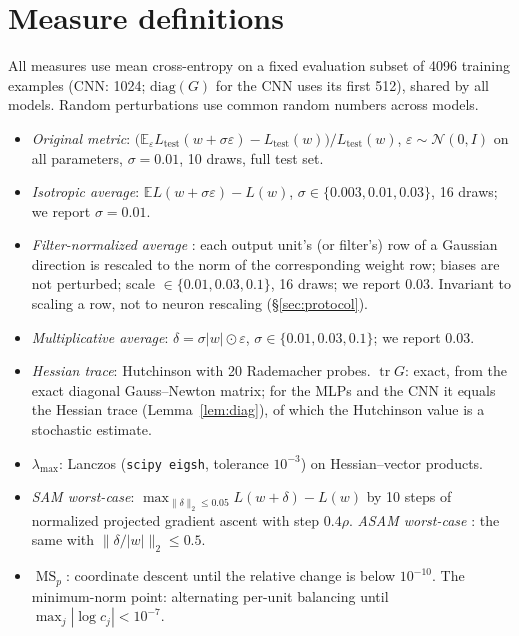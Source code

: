 \documentclass[10pt]{article}
\theoremstyle{remark}
\newcommand{\tr}{\operatorname{tr}}
\newcommand{\MS}{\operatorname{MS}}
\begin{document}



\appendix
\section{Measure definitions}\label{app:measures}
All measures use mean cross-entropy on a fixed evaluation subset of 4096 training examples (CNN: 1024; $\mathrm{diag}(G)$ for the CNN uses its first 512), shared by all models. Random perturbations use common random numbers across models.
\begin{itemize}[leftmargin=1.2em,itemsep=1pt]
\item \emph{Original metric}: $\big(\mathbb{E}_\varepsilon L_{\mathrm{test}}(w+\sigma\varepsilon)-L_{\mathrm{test}}(w)\big)/L_{\mathrm{test}}(w)$, $\varepsilon\sim\mathcal N(0,I)$ on all parameters, $\sigma=0.01$, 10 draws, full test set.
\item \emph{Isotropic average}: $\mathbb{E}L(w+\sigma\varepsilon)-L(w)$, $\sigma\in\{0.003,0.01,0.03\}$, 16 draws; we report $\sigma=0.01$.
\item \emph{Filter-normalized average} \citep{li2018visualizing}: each output unit's (or filter's) row of a Gaussian direction is rescaled to the norm of the corresponding weight row; biases are not perturbed; scale $\in\{0.01,0.03,0.1\}$, 16 draws; we report $0.03$. Invariant to scaling a row, not to neuron rescaling (\S\ref{sec:protocol}).
\item \emph{Multiplicative average}: $\delta=\sigma|w|\odot\varepsilon$, $\sigma\in\{0.01,0.03,0.1\}$; we report $0.03$.
\item \emph{Hessian trace}: Hutchinson with 20 Rademacher probes. $\tr G$: exact, from the exact diagonal Gauss--Newton matrix; for the MLPs and the CNN it equals the Hessian trace (Lemma~\ref{lem:diag}), of which the Hutchinson value is a stochastic estimate.
\item $\lambda_{\max}$: Lanczos (\texttt{scipy eigsh}, tolerance $10^{-3}$) on Hessian--vector products.
\item \emph{SAM worst-case}: $\max_{\|\delta\|_2\le0.05}L(w+\delta)-L(w)$ by 10 steps of normalized projected gradient ascent with step $0.4\rho$. \emph{ASAM worst-case} \citep{kwon2021asam}: the same with $\|\delta/|w|\|_2\le0.5$.
\item $\MS_p$: coordinate descent until the relative change is below $10^{-10}$. The minimum-norm point: alternating per-unit balancing until $\max_j|\log c_j|<10^{-7}$.
\end{itemize}
\end{document}
